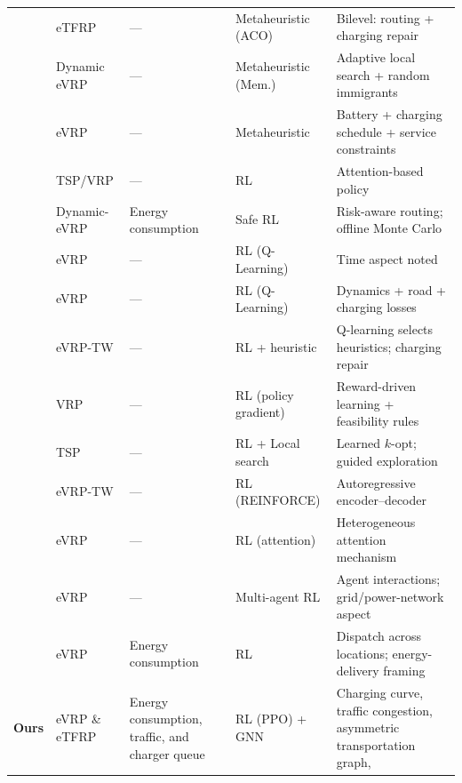 \documentclass[journal]{IEEEtran}
\begin{document}
\begin{table}
\begin{tabular}{p{0.5cm}p{1.8cm}p{3.0cm}p{2.5cm}p{7cm}}
\cite{9409782} &
eTFRP &
--- &
Metaheuristic (ACO) &
Bilevel: routing + charging repair \\



\cite{https://doi.org/10.1155/2021/6635749} &
Dynamic eVRP &
--- &
Metaheuristic (Mem.) &
Adaptive local search + random immigrants \\


\cite{https://doi.org/10.1049/pel2.12555} &
eVRP &
--- &
Metaheuristic &
Battery + charging schedule + service constraints \\

\midrule
\cite{kool2018attention} &
TSP/VRP &
--- &
RL&
Attention-based policy \\



\cite{BASSO2022102496} &
Dynamic-eVRP &
Energy consumption &
Safe RL &
Risk-aware routing; offline Monte Carlo \\



\cite{lin2025} &
eVRP&
--- &
RL (Q-Learning) &
Time aspect noted \\

\cite{TANG2023121711} &
eVRP &
--- &
RL (Q-Learning)&
Dynamics + road + charging losses \\

\cite{lin2022} &
eVRP-TW &
--- &
RL + heuristic &
Q-learning selects heuristics; charging repair \\

\cite{NEURIPS2018_9fb4651c} &
VRP &
--- &
RL (policy gradient) &
Reward-driven learning + feasibility rules \\

\cite{NEURIPS2023_9bae70d3} &
TSP &
--- &
RL + Local search &
Learned $k$-opt; guided exploration \\

\cite{10608117} &
eVRP-TW &
--- &
RL (REINFORCE) &
Autoregressive encoder--decoder \\

\cite{11016767} &
eVRP &
--- &
RL (attention) &
Heterogeneous attention mechanism \\

\cite{10310266} &
eVRP &
--- &
Multi-agent RL &
Agent interactions; grid/power-network aspect \\

\cite{ALQAHTANI2022122626} &
eVRP &
Energy consumption &
RL&
Dispatch across locations; energy-delivery framing \\

\midrule
\textbf{Ours} &
eVRP \& eTFRP &
Energy consumption, traffic, and charger queue &
RL (PPO) + GNN &
Charging curve, traffic congestion, asymmetric transportation graph,  \\

\bottomrule
\end{tabular}
\end{table}
\end{document}
